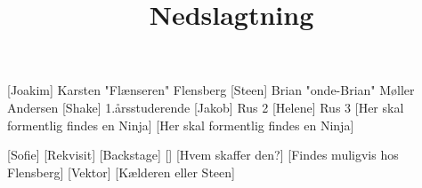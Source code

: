 \documentclass[a4paper,11pt]{article}
\title{Nedslagtning}
\begin{document}
\maketitle

\begin{roles}
[Joakim] Karsten "Flænseren" Flensberg
[Steen] Brian "onde-Brian" Møller Andersen
[Shake] 1.årsstuderende
[Jakob] Rus 2
[Helene] Rus 3
[Her skal formentlig findes en Ninja]
[Her skal formentlig findes en Ninja]
\end{roles}


\begin{props}
[Sofie]
[Rekvisit]
[Backstage]
[]
[Hvem skaffer den?]
[Findes muligvis hos Flensberg]
[Vektor]
[Kælderen eller Steen]
\end{props}
\end{document}
